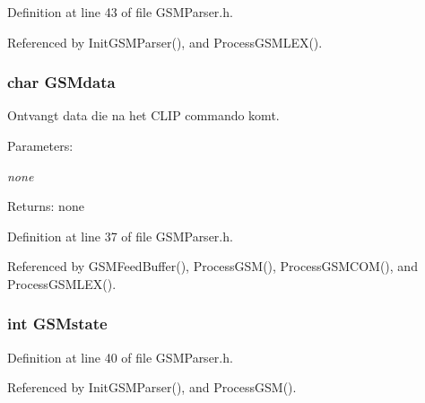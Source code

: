 Definition at line 43 of file GSMParser.h.

Referenced by InitGSMParser(), and ProcessGSMLEX().
\subsubsection{\setlength{\rightskip}{0pt plus 5cm}char {\bf GSMdata}}\label{_g_s_m_parser_8h_dac608a73a2d11910300469203bb6bff}


Ontvangt data die na het CLIP commando komt. 

\begin{Desc}
\item[Parameters:]
\begin{description}
\item[{\em none}]\end{description}
\end{Desc}
\begin{Desc}
\item[Returns:]none \end{Desc}


Definition at line 37 of file GSMParser.h.

Referenced by GSMFeedBuffer(), ProcessGSM(), ProcessGSMCOM(), and ProcessGSMLEX().
\subsubsection{\setlength{\rightskip}{0pt plus 5cm}int {\bf GSMstate}}\label{_g_s_m_parser_8h_1725194d30292394fd6f4096fa3f3964}




Definition at line 40 of file GSMParser.h.

Referenced by InitGSMParser(), and ProcessGSM().